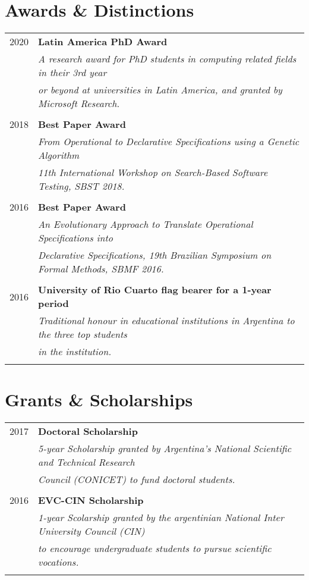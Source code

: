 \documentclass[a4paper,10pt]{article} %
\begin{document}
\section{Awards \& Distinctions}
\begin{tabular}{rl}
\\
\textsc{2020} & \textbf{Latin America PhD Award} \\
& \textit{A research award for PhD students in computing related fields in their 3rd year} \\
& \textit{or beyond at universities in Latin America, and granted by Microsoft Research.} \\ & \\

\textsc{2018} & \textbf{Best Paper Award} \\ 
& \textit{From Operational to Declarative Specifications using a Genetic Algorithm} \\
& \textit{11th International Workshop on Search-Based Software Testing, SBST 2018.} \\ & \\

\textsc{2016} & \textbf{Best Paper Award} \\ 
& \textit{An Evolutionary Approach to Translate Operational Specifications into } \\
& \textit{Declarative Specifications, 19th Brazilian Symposium on Formal Methods, SBMF 2016.} \\ & \\

\textsc{2016} & \textbf{University of Rio Cuarto flag bearer for a 1-year period} \\ 
& \textit{Traditional honour in educational institutions in Argentina to the three top students} \\ 
& \textit{in the institution.} \\ & \\
\end{tabular}

\section{Grants \& Scholarships}
\begin{tabular}{rl}
\\
\textsc{2017} & \textbf{Doctoral Scholarship} \\ 
& \textit{5-year Scholarship granted by Argentina's National Scientific and Technical Research} \\
& \textit{Council (CONICET) to fund doctoral students.} \\ & \\

\textsc{2016} & \textbf{EVC-CIN Scholarship} \\ 
& \textit{1-year Scolarship granted by the argentinian National Inter University Council (CIN)} \\
& \textit{to encourage undergraduate students to pursue scientific vocations.} \\ & \\

\end{tabular}
\end{document}
